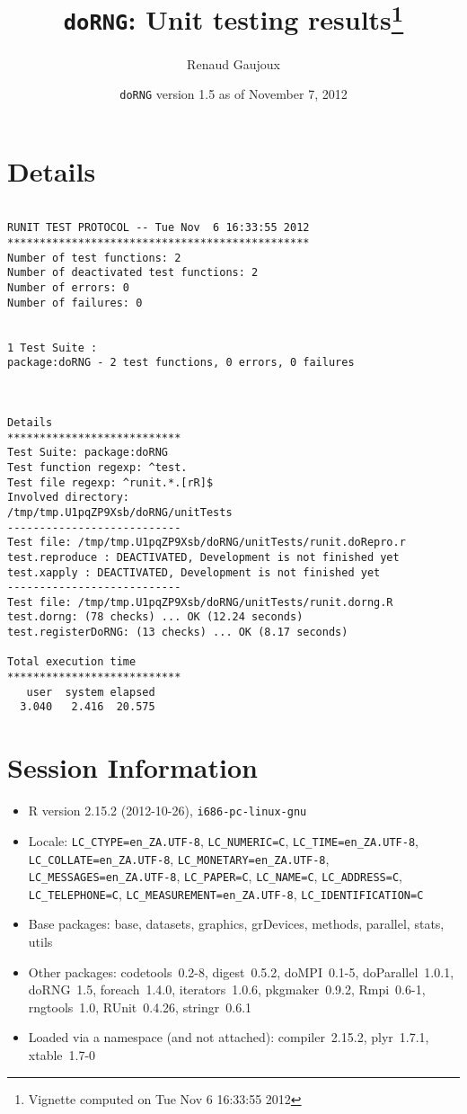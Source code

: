 \documentclass[10pt]{article}
\author{Renaud Gaujoux}
\title{\texttt{doRNG}: Unit testing results\footnote{Vignette computed  on Tue Nov  6 16:33:55 2012}}
\date{\texttt{doRNG} version 1.5 as of November  7, 2012}
\begin{document}
\maketitle

\section{Details}
\begin{verbatim}

RUNIT TEST PROTOCOL -- Tue Nov  6 16:33:55 2012 
*********************************************** 
Number of test functions: 2 
Number of deactivated test functions: 2 
Number of errors: 0 
Number of failures: 0 

 
1 Test Suite : 
package:doRNG - 2 test functions, 0 errors, 0 failures



Details 
*************************** 
Test Suite: package:doRNG 
Test function regexp: ^test. 
Test file regexp: ^runit.*.[rR]$ 
Involved directory: 
/tmp/tmp.U1pqZP9Xsb/doRNG/unitTests 
--------------------------- 
Test file: /tmp/tmp.U1pqZP9Xsb/doRNG/unitTests/runit.doRepro.r 
test.reproduce : DEACTIVATED, Development is not finished yet
test.xapply : DEACTIVATED, Development is not finished yet
--------------------------- 
Test file: /tmp/tmp.U1pqZP9Xsb/doRNG/unitTests/runit.dorng.R 
test.dorng: (78 checks) ... OK (12.24 seconds)
test.registerDoRNG: (13 checks) ... OK (8.17 seconds)

Total execution time
***************************
   user  system elapsed 
  3.040   2.416  20.575 

\end{verbatim}

\section*{Session Information}
\begin{itemize}\raggedright
  \item R version 2.15.2 (2012-10-26), \verb|i686-pc-linux-gnu|
  \item Locale: \verb|LC_CTYPE=en_ZA.UTF-8|, \verb|LC_NUMERIC=C|, \verb|LC_TIME=en_ZA.UTF-8|, \verb|LC_COLLATE=en_ZA.UTF-8|, \verb|LC_MONETARY=en_ZA.UTF-8|, \verb|LC_MESSAGES=en_ZA.UTF-8|, \verb|LC_PAPER=C|, \verb|LC_NAME=C|, \verb|LC_ADDRESS=C|, \verb|LC_TELEPHONE=C|, \verb|LC_MEASUREMENT=en_ZA.UTF-8|, \verb|LC_IDENTIFICATION=C|
  \item Base packages: base, datasets, graphics, grDevices, methods,
    parallel, stats, utils
  \item Other packages: codetools~0.2-8, digest~0.5.2, doMPI~0.1-5,
    doParallel~1.0.1, doRNG~1.5, foreach~1.4.0, iterators~1.0.6,
    pkgmaker~0.9.2, Rmpi~0.6-1, rngtools~1.0, RUnit~0.4.26,
    stringr~0.6.1
  \item Loaded via a namespace (and not attached): compiler~2.15.2,
    plyr~1.7.1, xtable~1.7-0
\end{itemize}
\end{document}
